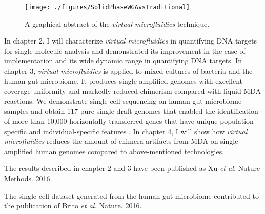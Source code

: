 \begin{figure}[ht!]
\centering
\texttt{[image: ./figures/SolidPhaseWGAvsTraditional]}
\caption[A graphical abstract of the \textit{virtual microfluidics} technique]{A graphical abstract of the \textit{virtual microfluidics} technique.}
\label{fig:FigAbstract}
\end{figure}

In chapter 2, I will characterize \textit{virtual microfluidics} in quantifying DNA targets for single-molecule analysis and demonstrated its improvement in the ease of implementation and its wide dynamic range in quantifying DNA targets. In chapter 3, \textit{virtual microfluidics} is applied to mixed cultures of bacteria and the human gut microbiome. It produces single amplified genomes with excellent coverage uniformity and markedly reduced chimerism compared with liquid MDA reactions. We demonstrate single-cell sequencing on human gut microbiome samples and obtain 117 pure single draft genomes that enabled the identification of more than 10,000 horizontally transferred genes that have unique population-specific and individual-specific features \cite{Brito:2016cd}. In chapter 4, I will show how \textit{virtual microfluidics} reduces the amount of chimera artifacts from MDA on single amplified human genomes compared to above-mentioned technologies. 
 
The results described in chapter 2 and 3 have been published as Xu \textit{et al.} Nature Methods. 2016.

The single-cell dataset generated from the human gut microbiome contributed to the publication of Brito \textit{et al.} Nature. 2016.

